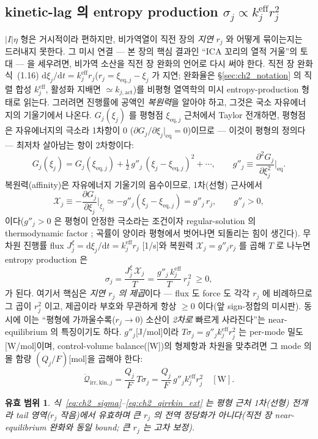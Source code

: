 \documentclass[11pt,a4paper]{article}
\newtheorem*{boundbox}{유효 범위}
\newcommand{\dd}{\mathrm{d}}
\newcommand{\eff}{\mathrm{eff}}
\newcommand{\eq}{\mathrm{eq}}
\newcommand{\irr}{\mathrm{irr}}
\newcommand{\kin}{\mathrm{kin}}
\begin{document}
\subsection{kinetic-lag 의 entropy production $\sigma_j\propto k_j^{\eff} r_j^2$}\label{sec:ch2_sigma}
$|I|\eta$ 형은 거시적이라 편하지만, 비가역열이 직전 장의 \emph{지연} $r_j$ 와 어떻게 묶이는지는 드러내지 못한다.
그 미시 연결 — 본 장의 핵심 결과인 ``ICA 꼬리의 열적 거울''의 토대 — 을 세우려면, 비가역 소산을 직전 장 완화의 언어로
다시 써야 한다. 직전 장 완화식~(1.16) $\dd\xi_j/\dd t=k_j^{\eff} r_j$($r_j=\xi_{\eq,j}-\xi_j$ 가 지연; 완화율은
\S\ref{sec:ch2_notation} 의 직렬 합성 $k_j^{\eff}$, 활성화 지배면 $\simeq k_{j,\mathrm{act}}$)를 비평형 열역학의
미시 entropy-production 형태로 읽는다. 그러려면 진행률에 공액인 \emph{복원력}을 알아야 하고, 그것은 국소 자유에너지의
기울기에서 나온다. $G_j(\xi_j)$ 를 평형점 $\xi_{\eq,j}$ 근처에서 Taylor 전개하면, 평형점은 자유에너지의 극소라
1차항이 0 ($\partial G_j/\partial\xi_j|_\eq=0$)이므로 — 이것이 평형의 정의다 — 최저차 살아남는 항이 2차항이다:
\begin{equation}
G_j(\xi_j)=G_j(\xi_{\eq,j})+\tfrac12\,g''_j\,(\xi_j-\xi_{\eq,j})^2+\cdots,\qquad
g''_j\equiv\frac{\partial^2 G_j}{\partial\xi_j^2}\Big|_\eq.
\label{eq:ch2_Gtaylor}
\end{equation}
복원력(affinity)은 자유에너지 기울기의 음수이므로, 1차(선형) 근사에서
\begin{equation}
\mathcal X_j\equiv-\frac{\partial G_j}{\partial\xi_j}\Big|_{\xi_j}\simeq-g''_j(\xi_j-\xi_{\eq,j})=g''_j\,r_j,
\qquad g''_j>0,
\label{eq:ch2_Xaffinity}
\end{equation}
이다($g''_j>0$ 은 평형이 안정한 극소라는 조건이자 regular-solution 의 thermodynamic factor \cite{bazant2013}; 곡률이
양이라 평형에서 벗어나면 되돌리는 힘이 생긴다). 무차원 진행률 flux $J^\xi_j=\dd\xi_j/\dd t=k_j^{\eff} r_j$ [1/s]와
복원력 $\mathcal X_j=g''_j r_j$ 를 곱해 $T$ 로 나누면 entropy production 은
\begin{equation}
\boxed{\;\sigma_j=\frac{J^\xi_j\,\mathcal X_j}{T}=\frac{g''_j\,k_j^{\eff}}{T}\,r_j^{\,2}\ \ge 0,\;}
\label{eq:ch2_sigma}
\end{equation}
가 된다. 여기서 핵심은 \emph{지연 $r_j$ 의 제곱}이다 — flux 도 force 도 각각 $r_j$ 에 비례하므로 그 곱이 $r_j^2$
이고, 제곱이라 부호와 무관하게 항상 $\ge0$ 이다(앞 sign-정합의 미시판). 동시에 이는 ``평형에 가까울수록($r_j\to0$)
소산이 \emph{2차로} 빠르게 사라진다''는 near-equilibrium 의 특징이기도 하다. $g''_j$[J/mol]이라 $T\sigma_j=g''_j
k_j^{\eff} r_j^2$ 는 per-mode 밀도 [W/mol]이며, control-volume balance([W])의 형제항과 차원을 맞추려면 그 mode 의 몰
함량 $(Q_j/F)$[mol]을 곱해야 한다:
\begin{equation}
\dot{\mathcal Q}_{\irr,\kin,j}=\frac{Q_j}{F}\,T\sigma_j=\frac{Q_j}{F}\,g''_j k_j^{\eff} r_j^2\quad[\mathrm W].
\label{eq:ch2_qirrkin_ext}
\end{equation}
\begin{boundbox}
식~\eqref{eq:ch2_sigma}--\eqref{eq:ch2_qirrkin_ext} 는 평형 근처 1차(선형) 전개라 tail 영역($r_j$ 작음)에서
유효하며 큰 $r_j$ 의 전역 정당화가 아니다(직전 장 near-equilibrium 완화와 동일 bound; 큰 $r_j$ 는 고차 보정).
\end{boundbox}
\end{document}

